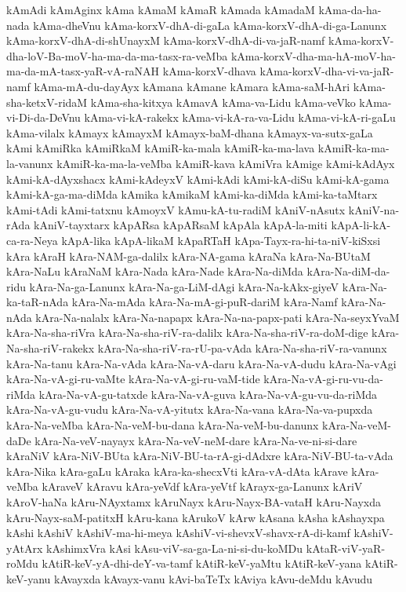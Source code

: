 {kAmAdi
kAmAginx
kAma
kAmaM
kAmaR
kAmada
kAmadaM
kAma-da-ha-nada
kAma-dheVnu
kAma-korxV-dhA-di-gaLa
kAma-korxV-dhA-di-ga-Lanunx
kAma-korxV-dhA-di-shUnayxM
kAma-korxV-dhA-di-va-jaR-namf
kAma-korxV-dha-loV-Ba-moV-ha-ma-da-ma-tasx-ra-veMba
kAma-korxV-dha-ma-hA-moV-ha-ma-da-mA-tasx-yaR-vA-raNAH
kAma-korxV-dhava
kAma-korxV-dha-vi-va-jaR-namf
kAma-mA-du-dayAyx
kAmana
kAmane
kAmara
kAma-saM-hAri
kAma-sha-ketxV-ridaM
kAma-sha-kitxya
kAmavA
kAma-va-Lidu
kAma-veVko
kAma-vi-Di-da-DeVnu
kAma-vi-kA-rakekx
kAma-vi-kA-ra-va-Lidu
kAma-vi-kA-ri-gaLu
kAma-vilalx
kAmayx
kAmayxM
kAmayx-baM-dhana
kAmayx-va-sutx-gaLa
kAmi
kAmiRka
kAmiRkaM
kAmiR-ka-mala
kAmiR-ka-ma-lava
kAmiR-ka-ma-la-vanunx
kAmiR-ka-ma-la-veMba
kAmiR-kava
kAmiVra
kAmige
kAmi-kAdAyx
kAmi-kA-dAyxshacx
kAmi-kAdeyxV
kAmi-kAdi
kAmi-kA-diSu
kAmi-kA-gama
kAmi-kA-ga-ma-diMda
kAmika
kAmikaM
kAmi-ka-diMda
kAmi-ka-taMtarx
kAmi-tAdi
kAmi-tatxnu
kAmoyxV
kAmu-kA-tu-radiM
kAniV-nAsutx
kAniV-na-rAda
kAniV-tayxtarx
kApARsa
kApARsaM
kApAla
kApA-la-miti
kApA-li-kA-ca-ra-Neya
kApA-lika
kApA-likaM
kApaRTaH
kApa-Tayx-ra-hi-ta-niV-kiSxsi
kAra
kAraH
kAra-NAM-ga-dalilx
kAra-NA-gama
kAraNa
kAra-Na-BUtaM
kAra-NaLu
kAraNaM
kAra-Nada
kAra-Nade
kAra-Na-diMda
kAra-Na-diM-da-ridu
kAra-Na-ga-Lanunx
kAra-Na-ga-LiM-dAgi
kAra-Na-kAkx-giyeV
kAra-Na-ka-taR-nAda
kAra-Na-mAda
kAra-Na-mA-gi-puR-dariM
kAra-Namf
kAra-Na-nAda
kAra-Na-nalalx
kAra-Na-napapx
kAra-Na-na-papx-pati
kAra-Na-seyxYvaM
kAra-Na-sha-riVra
kAra-Na-sha-riV-ra-dalilx
kAra-Na-sha-riV-ra-doM-dige
kAra-Na-sha-riV-rakekx
kAra-Na-sha-riV-ra-rU-pa-vAda
kAra-Na-sha-riV-ra-vanunx
kAra-Na-tanu
kAra-Na-vAda
kAra-Na-vA-daru
kAra-Na-vA-dudu
kAra-Na-vAgi
kAra-Na-vA-gi-ru-vaMte
kAra-Na-vA-gi-ru-vaM-tide
kAra-Na-vA-gi-ru-vu-da-riMda
kAra-Na-vA-gu-tatxde
kAra-Na-vA-guva
kAra-Na-vA-gu-vu-da-riMda
kAra-Na-vA-gu-vudu
kAra-Na-vA-yitutx
kAra-Na-vana
kAra-Na-va-pupxda
kAra-Na-veMba
kAra-Na-veM-bu-dana
kAra-Na-veM-bu-danunx
kAra-Na-veM-daDe
kAra-Na-veV-nayayx
kAra-Na-veV-neM-dare
kAra-Na-ve-ni-si-dare
kAraNiV
kAra-NiV-BUta
kAra-NiV-BU-ta-rA-gi-dAdxre
kAra-NiV-BU-ta-vAda
kAra-Nika
kAra-gaLu
kAraka
kAra-ka-shecxVti
kAra-vA-dAta
kArave
kAra-veMba
kAraveV
kAravu
kAra-yeVdf
kAra-yeVtf
kArayx-ga-Lanunx
kAriV
kAroV-haNa
kAru-NAyxtamx
kAruNayx
kAru-Nayx-BA-vataH
kAru-Nayxda
kAru-Nayx-saM-patitxH
kAru-kana
kArukoV
kArw
kAsana
kAsha
kAshayxpa
kAshi
kAshiV
kAshiV-ma-hi-meya
kAshiV-vi-shevxV-shavx-rA-di-kamf
kAshiV-yAtArx
kAshimxVra
kAsi
kAsu-viV-sa-ga-La-ni-si-du-koMDu
kAtaR-viV-yaR-roMdu
kAtiR-keV-yA-dhi-deY-va-tamf
kAtiR-keV-yaMtu
kAtiR-keV-yana
kAtiR-keV-yanu
kAvayxda
kAvayx-vanu
kAvi-baTeTx
kAviya
kAvu-deMdu
kAvudu
}
